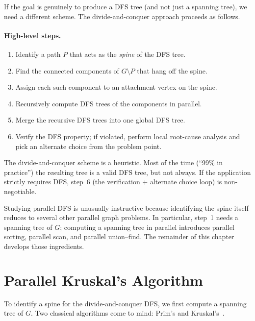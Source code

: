 If the goal is genuinely to produce a DFS tree (and not just a
spanning tree), we need a different scheme.  The divide-and-conquer
approach proceeds as follows.

\paragraph{High-level steps.}
\begin{enumerate}
  \item Identify a path $P$ that acts as the \emph{spine} of the DFS
        tree.
  \item Find the connected components of $G \setminus P$ that hang off
        the spine.
  \item Assign each such component to an attachment vertex on the
        spine.
  \item Recursively compute DFS trees of the components in parallel.
  \item Merge the recursive DFS trees into one global DFS tree.
  \item Verify the DFS property; if violated, perform local
        root-cause analysis and pick an alternate choice from the
        problem point.
\end{enumerate}

The divide-and-conquer scheme is a heuristic.  Most of the time
(``99\% in practice'') the resulting tree is a valid DFS tree, but
not always.  If the application strictly requires DFS, step~6 (the
verification + alternate choice loop) is non-negotiable.

\begin{ppnote}
Studying parallel DFS is unusually instructive because identifying the
spine itself reduces to several other parallel graph problems.  In
particular, step~1 needs a spanning tree of $G$; computing a spanning
tree in parallel introduces parallel sorting, parallel scan, and
parallel union--find.  The remainder of this chapter develops those
ingredients.
\end{ppnote}

\section{Parallel Kruskal's Algorithm}
\label{sec:parallel-kruskal}

To identify a spine for the divide-and-conquer DFS, we first compute a
spanning tree of $G$.  Two classical algorithms come to mind: Prim's
and Kruskal's~\cite{kruskal1956}.

